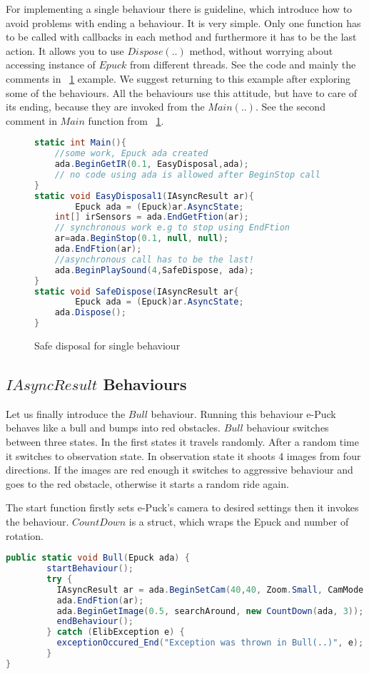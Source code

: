 	For implementing a single behaviour there is guideline, which introduce how to avoid problems with ending a behaviour.
	It is very simple. Only one function has to be called  with callbacks in each method and 
	furthermore it has to be the last action. It allows you to use $Dispose(..)$ method, 
	without worrying about accessing instance of $Epuck$  from different threads.
	See the code and mainly the comments in ~\ref{safedis} example. 
	We suggest returning to this example after exploring some of the behaviours.
	All the behaviours use this attitude, but have to care of its ending, because they are invoked from the $Main(..)$. 
	See the second comment in $Main$ function from ~\ref{safedis}.
\begin{figure}[!hbp]	
\begin{lstlisting}[language=cs]
static int Main(){
	//some work, Epuck ada created
	ada.BeginGetIR(0.1, EasyDisposal,ada);
	// no code using ada is allowed after BeginStop call
}
static void EasyDisposal1(IAsyncResult ar){
        Epuck ada = (Epuck)ar.AsyncState;
	int[] irSensors = ada.EndGetFtion(ar);
	// synchronous work e.g to stop using EndFtion
	ar=ada.BeginStop(0.1, null, null);
	ada.EndFtion(ar);
	//asynchronous call has to be the last!
	ada.BeginPlaySound(4,SafeDispose, ada);
}
static void SafeDispose(IAsyncResult ar{
        Epuck ada = (Epuck)ar.AsyncState;
	ada.Dispose();
}
\end{lstlisting}
\caption{Safe disposal for single behaviour} \label{safedis}
\end{figure}

\subsection{$IAsyncResult$ Behaviours}\label{sec:iabehaviors}\label{sec:bull}
	Let us finally introduce the $Bull$ behaviour.
	Running this behaviour e-Puck behaves like a bull and bumps into red obstacles.
	$Bull$ behaviour switches between three states. In the first states it travels randomly. 
	After a random time it switches to observation state.
	In observation state it shoots 4 images from four directions. If the images are red enough 
	it switches to aggressive behaviour and goes to the red obstacle,
	otherwise it starts a random ride again.

	
	The start function firstly sets e-Puck's camera to desired settings then it invokes the behaviour.
	$CountDown$ is a struct, which wraps the Epuck and number of rotation.

\begin{lstlisting}[language=cs]
public static void Bull(Epuck ada) {
        startBehaviour();
        try {
          IAsyncResult ar = ada.BeginSetCam(40,40, Zoom.Small, CamMode.Color, toSetCam, null, null);
          ada.EndFtion(ar);
          ada.BeginGetImage(0.5, searchAround, new CountDown(ada, 3));
          endBehaviour();
        } catch (ElibException e) {
          exceptionOccured_End("Exception was thrown in Bull(..)", e);
        }
}
\end{lstlisting}
	
